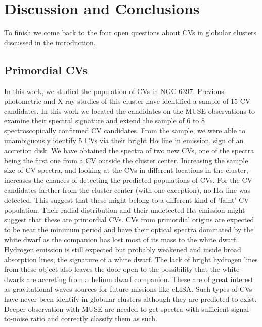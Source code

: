 \chapter{Discussion and Conclusions}\label{chap:conclu}
\thispagestyle{fancy}

To finish we come back to the four open questions about CVs in globular clusters discussed in the introduction. 


\section{Primordial CVs}

In this work, we studied the population of CVs in NGC 6397. Previous photometric and X-ray studies of this cluster have identified a sample of 15 CV candidates. In this work we located the candidates on the MUSE observations to examine their spectral signature and extend the sample of 6 to 8 spectroscopically confirmed CV candidates. From the sample, we were able to unambiguously identify 5 CVs via their bright H$\alpha$ line in emission, sign of an accretion disk. We have obtained the spectra of two new CVs, one of the spectra being the first one from a CV outside the cluster center. Increasing the sample size of CV spectra, and looking at the CVs in different locations in the cluster, increases the chances of detecting the predicted populations of CVs. For the CV candidates farther from the cluster center (with one exception), no H$\alpha$ line was detected. This suggest that these might belong to a different kind of 'faint' CV population. Their radial distribution and their undetected H$\alpha$ emission might suggest that these are primordial CVs. CVs from primordial origins are expected to be near the minimum period and have their optical spectra dominated by the white dwarf as the companion has lost most of its mass to the white dwarf. Hydrogen emission is still expected but probably weakened and inside broad absorption lines, the signature of a white dwarf. The lack of bright hydrogen lines from these object also leaves the door open to the possibility that the white dwarfs are accreting from a helium dwarf companion. These are of great interest as gravitational waves sources for future missions like eLISA. Such types of CVs have never been identify in globular clusters although they are predicted to exist. Deeper observation with MUSE are needed to get spectra with sufficient signal-to-noise ratio and correctly classify them as such. 

